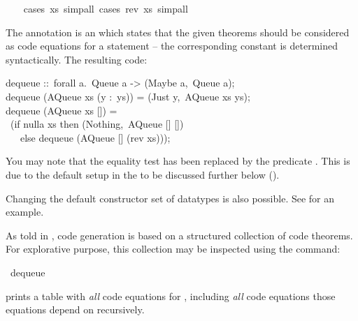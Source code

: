 \begin{isabellebody}
\ \ \isamarkupfalse%
\ {\isacharparenleft}cases\ xs{\isacharcomma}\ simp{\isacharunderscore}all{\isacharparenright}\ {\isacharparenleft}cases\ {\isachardoublequoteopen}rev\ xs{\isachardoublequoteclose}{\isacharcomma}\ simp{\isacharunderscore}all{\isacharparenright}%
\endisatagquote
{\isafoldquote}%
%
\isadelimquote
%
\endisadelimquote
%
\begin{isamarkuptext}%
\noindent The annotation  is an 
   which states that the given theorems should be
  considered as code equations for a  statement --
  the corresponding constant is determined syntactically.  The resulting code:%
\end{isamarkuptext}%
\isamarkuptrue%
%
\isadelimquote
%
\endisadelimquote
%
\isatagquote
%
\begin{isamarkuptext}%
\isatypewriter%
\noindent%
\hspace*{0pt}dequeue ::~forall a.~Queue a -> (Maybe a,~Queue a);\\
\hspace*{0pt}dequeue (AQueue xs (y :~ys)) = (Just y,~AQueue xs ys);\\
\hspace*{0pt}dequeue (AQueue xs []) =\\
\hspace*{0pt} ~(if nulla xs then (Nothing,~AQueue [] [])\\
\hspace*{0pt} ~~~else dequeue (AQueue [] (rev xs)));%
\end{isamarkuptext}%
\isamarkuptrue%
%
\endisatagquote
{\isafoldquote}%
%
\isadelimquote
%
\endisadelimquote
%
\begin{isamarkuptext}%
\noindent You may note that the equality test  has been
  replaced by the predicate .  This is due to the default
  setup in the  to be discussed further below ().

  Changing the default constructor set of datatypes is also
  possible.  See  for an example.

  As told in , code generation is based
  on a structured collection of code theorems.
  For explorative purpose, this collection
  may be inspected using the \hyperlink{command.code-thms}{\mbox{}} command:%
\end{isamarkuptext}%
\isamarkuptrue%
%
\isadelimquote
%
\endisadelimquote
%
\isatagquote
{}\isamarkupfalse%
\ dequeue%
\endisatagquote
{\isafoldquote}%
%
\isadelimquote
%
\endisadelimquote
%
\begin{isamarkuptext}%
\noindent prints a table with \emph{all} code equations
  for , including
  \emph{all} code equations those equations depend
  on recursively.
  

\end{isamarkuptext}
\end{isabellebody}
